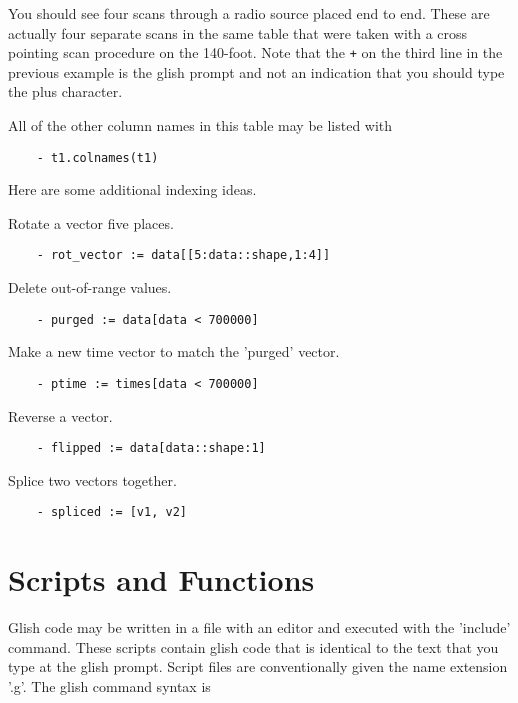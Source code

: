You should see four scans through a radio source placed end to end.  These
are actually four separate scans in the same table that were taken with a
cross pointing scan procedure on the 140-foot.  Note that the \verb!+!
on the third line in the previous example is the glish prompt
and not an indication that you should type the plus character.

    All of the other column names in this table may be listed with

\begin{verbatim}
	- t1.colnames(t1)
\end{verbatim}

    Here are some additional indexing ideas.

Rotate a vector five places.

\begin{verbatim}
	- rot_vector := data[[5:data::shape,1:4]]
\end{verbatim}

Delete out-of-range values.

\begin{verbatim}
	- purged := data[data < 700000]
\end{verbatim}

Make a new time vector to match the 'purged' vector.

\begin{verbatim}
	- ptime := times[data < 700000]
\end{verbatim}

Reverse a vector.

\begin{verbatim}
	- flipped := data[data::shape:1]
\end{verbatim}

Splice two vectors together.

\begin{verbatim}
	- spliced := [v1, v2]
\end{verbatim}

\section{Scripts and Functions}

    Glish code may be written in a file with an editor and executed with
the 'include' command.  These scripts contain glish code that is identical
to the text that you type at the glish prompt.  Script files are
conventionally given the name extension '.g'.  The glish command syntax is

